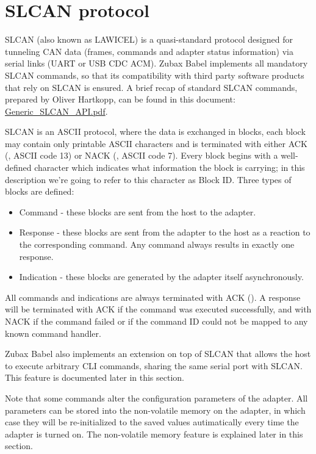 \documentclass{zubaxdoc}
\begin{document}
\chapter{SLCAN protocol}

SLCAN (also known as LAWICEL) is a quasi-standard protocol designed for tunneling CAN data (frames, commands and adapter status information) via serial links (UART or USB CDC ACM). Zubax Babel implements all mandatory SLCAN commands, so that its compatibility with third party software products that rely on SLCAN is ensured. A brief recap of standard SLCAN commands, prepared by Oliver Hartkopp, can be found in this document: \href{https://docs.zubax.com/zubax_babel/Generic_SLCAN_API.pdf}{Generic\_SLCAN\_API.pdf}.

SLCAN is an ASCII protocol, where the data is exchanged in blocks, each block may contain only printable ASCII characters and is terminated with either ACK (, ASCII code 13) or NACK (, ASCII code 7). Every block begins with a well-defined character which indicates what information the block is carrying; in this description we’re going to refer to this character as Block ID. Three types of blocks are defined:

\begin{itemize}
\item Command - these blocks are sent from the host to the adapter.
\item Response - these blocks are sent from the adapter to the host as a reaction to the corresponding command. Any command always results in exactly one response.
\item Indication - these blocks are generated by the adapter itself asynchronously.
\end{itemize}

All commands and indications are always terminated with ACK (). A response will be terminated with ACK if the command was executed successfully, and with NACK if the command failed or if the command ID could not be mapped to any known command handler.

Zubax Babel also implements an extension on top of SLCAN that allows the host to execute arbitrary CLI commands, sharing the same serial port with SLCAN. This feature is documented later in this section.

Note that some commands alter the configuration parameters of the adapter. All parameters can be stored into the non-volatile memory on the adapter, in which case they will be re-initialized to the saved values autimatically every time the adapter is turned on. The non-volatile memory feature is explained later in this section.
\end{document}
